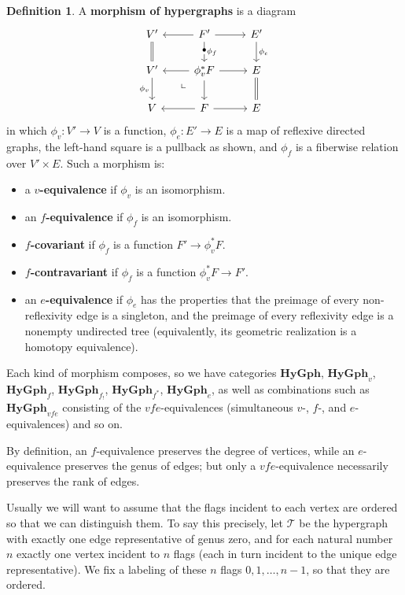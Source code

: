 \documentclass{article}
\theoremstyle{definition}
\newtheorem{defn}[thm]{Definition}
\theoremstyle{remark}
\newcommand{\dlpullback}[1][dl]{\ar[#1,phantom,near start,"\llcorner"]}
\def\hy{\mathbf{HyGph}}
\def\thy{\mathcal{T}}
\begin{document}
\begin{defn}
  A \textbf{morphism of hypergraphs} is a diagram
  \[
  \begin{tikzcd}
    V' \ar[d,equals] & F' \ar[l] \ar[r] \ar[d,"\smash\bullet" description,"\phi_f"] & E' \ar[d,"\phi_e"]\\
    V' \ar[d,"\phi_v"'] & \phi_v^* F \ar[d] \ar[r] \ar[l] \dlpullback[dl] & E \ar[d,equals]\\
    V  & F \ar[r] \ar[l] & E
  \end{tikzcd}
  \]
  in which $\phi_v : V'\to V$ is a function, $\phi_e : E'\to E$ is a map of reflexive directed graphs, the left-hand square is a pullback as shown, and $\phi_f$ is a fiberwise relation over $V'\times E$.
  Such a morphism is:
  \begin{itemize}
  \item a \textbf{$v$-equivalence} if $\phi_v$ is an isomorphism.
  \item an \textbf{$f$-equivalence} if $\phi_f$ is an isomorphism.
  \item \textbf{$f$-covariant} if $\phi_f$ is a function $F' \to \phi_v^* F$.
  \item \textbf{$f$-contravariant} if $\phi_f$ is a function $\phi_v^* F \to F'$.
  \item an \textbf{$e$-equivalence} if $\phi_e$ has the properties that the preimage of every non-reflexivity edge is a singleton, and the preimage of every reflexivity edge is a nonempty undirected tree (equivalently, its geometric realization is a homotopy equivalence).
  \end{itemize}
  Each kind of morphism composes, so we have categories $\hy$, $\hy_v$, $\hy_f$, $\hy_{f_!}$, $\hy_{f^*}$, $\hy_e$, as well as combinations such as $\hy_{vfe}$ consisting of the $vfe$-equivalences (simultaneous $v$-, $f$-, and $e$-equivalences) and so on.
\end{defn}

By definition, an $f$-equivalence preserves the degree of vertices, while an $e$-equivalence preserves the genus of edges; but only a $vfe$-equivalence necessarily preserves the rank of edges.

Usually we will want to assume that the flags incident to each vertex are ordered so that we can distinguish them.
To say this precisely, let $\thy$ be the hypergraph with exactly one edge representative of genus zero, and for each natural number $n$ exactly one vertex incident to $n$ flags (each in turn incident to the unique edge representative).
We fix a labeling of these $n$ flags $0,1,\dots,n-1$, so that they are ordered.
\end{document}
